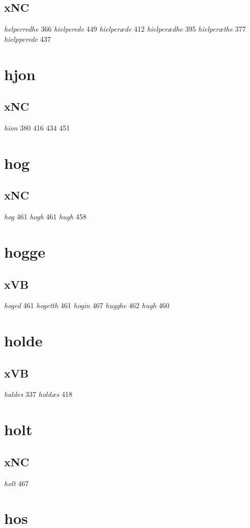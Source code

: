 \documentclass[a4paper,twocolumn]{article}
\begin{document}
\subsection{xNC}
\label{sec:org0a4e5c7}
\emph{helperredhe} 366 \emph{hielperede} 449 \emph{hielperæde} 412 \emph{hielperædhe} 395 \emph{hielperæthe} 377 \emph{hielpperede} 437 
\section{hjon}
\label{sec:orge7f3807}
\subsection{xNC}
\label{sec:org4c68432}
\emph{hion} 380 416 434 451 
\section{hog}
\label{sec:org9dd3b0c}
\subsection{xNC}
\label{sec:org46a1ba7}
\emph{hog} 461 \emph{hogh} 461 \emph{hugh} 458 
\section{hogge}
\label{sec:orge47e0ee}
\subsection{xVB}
\label{sec:orgd99b1ee}
\emph{hoged} 461 \emph{hogetth} 461 \emph{hogin} 467 \emph{hugghe} 462 \emph{hugh} 460 
\section{holde}
\label{sec:orgb8022ed}
\subsection{xVB}
\label{sec:org96307fc}
\emph{haldes} 337 \emph{holdæs} 418 
\section{holt}
\label{sec:org78bcae9}
\subsection{xNC}
\label{sec:orgcb6d69c}
\emph{holt} 467 
\section{hos}
\label{sec:orgf976c17}
\end{document}
